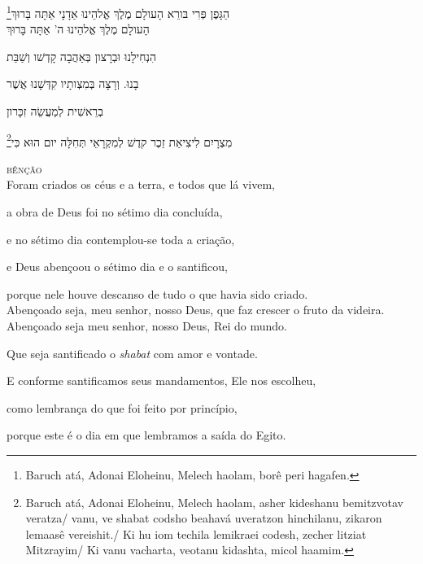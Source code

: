 \footnote{Baruch atá, Adonai Eloheinu, Melech haolam, borê peri hagafen.}הַגָּפֶן פְּרִי בּורֵא הָעולָם מֶלֶךְ אֱלהֵינוּ אַדָנָי אַתָּה בָּרוּךְ\\[10pt] 

הָעולָם מֶלֶךְ אֱלהֵינוּ ה' אַתָּה בָּרוּךְ

הִנְחִילָנוּ וּבְרָצון בְּאַהֲבָה קָדְשׁו וְשַׁבַּת

בָנוּ. וְרָצָה בְּמִצְותָיו קִדְּשָׁנוּ אֲשֶׁר

בְרֵאשִׁית לְמַעֲשֵׂה זִכָּרון

\footnote{Baruch atá, Adonai Eloheinu, Melech haolam, asher kideshanu bemitzvotav veratza/
vanu, ve shabat codsho beahavá uveratzon hinchilanu, zikaron lemaasê vereishit./
Ki hu iom techila lemikraei codesh, zecher litziat Mitzrayim/ Ki vanu vacharta, veotanu kidashta, micol haamim.}מִצְרָיִם לִיצִיאַת זֵכֶר קדֶשׁ לְמִקְרָאֵי תְּחִלָּה יום הוּא כִּי\\[10pt]


\movetooddpage
\raggedright

\vspace*{1cm}

\textsc{bênção}\\[15pt]

Foram criados os céus e a terra, e todos que lá vivem,

a obra de Deus foi no sétimo dia concluída,

e no sétimo dia contemplou-se toda a criação,

e Deus abençoou o sétimo dia e o santificou,

porque nele houve descanso \qb{}de tudo o que havia sido criado.\\[10pt]

Abençoado seja, meu senhor, nosso Deus, \qb{}que faz crescer o fruto da videira.\\[10pt]

Abençoado seja meu senhor, nosso Deus, Rei do mundo.

Que seja santificado o \textit{shabat} com amor e vontade.

E conforme santificamos seus mandamentos, \qb{}Ele nos escolheu,

como lembrança do que foi feito por princípio,

porque este é o dia em que lembramos a saída do Egito.\\[10pt]


\movetoevenpage
\raggedleft

\vspace*{1cm}


